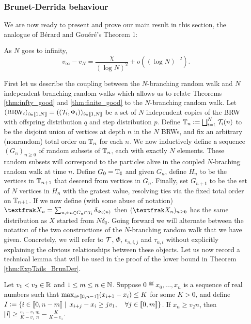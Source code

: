 \subsubsection{Brunet-Derrida behaviour}\label{sec:ExpTails_BrunDer}

We are now ready to present and prove our main result in this section, the analogue of Bérard and Gouéré's Theorem 1:
\begin{theorem}\label{thm:ExpTails_BrunDer}
As $N$ goes to infinity, 
\begin{equation*}
v_\infty - v_N = \frac{\chi}{(\log N)^2} + o((\log N)^{-2}). 
\end{equation*}
\end{theorem}

First let us describe the coupling between the $N$-branching random walk and $N$ independent branching random walks which allows us to relate Theorems \ref{thm:infty_good} and \ref{thm:finite_good} to the $N$-branching random walk. Let $(\text{BRW}_i)_{i \in \bbracket{1,N}} = ((\cal{T}_i, \Phi_i))_{i \in \bbracket{1,N}}$ be a set of $N$ independent copies of the BRW with offspring distribution $q$ and step distribution $p$. Define $\bb{T}_n \defeq \bigsqcup_{i=1}^N \cal{T}_i(n)$ to be the disjoint union of vertices at depth $n$ in the $N$ BRWs, and fix an arbitrary (nonrandom) total order on $\bb{T}_n$ for each $n$. We now inductively define a sequence $(G_n)_{n \geq 0}$ of random subsets of $\bb{T}_n$, each with exactly $N$ elements. These random subsets will correspond to the particles alive in the coupled $N$-braching random walk at time $n$. Define $G_0 = \bb{T}_0$ and given $G_n$, define $H_n$ to be the vertices in $\bb{T}_{n+1}$ that descend from vertices in $G_n$. Finally, set $G_{n+1}$ to be the set of $N$ vertices in $H_n$ with the gratest value, resolving ties via the fixed total order on $\bb{T}_{n+1}$. If we now define (with some abuse of notation) $\frak{X}_n = \sum_{u,i : u \in G_n \cap \cal{T}_i} \delta_{\Phi_i(u)}$ then $(\frak{X}_n)_{n \geq 0}$ has the same distribution as $X$ started from $N \delta_0$. Going forward we will alternate between the notation of the two constructions of the $N$-branching random walk that we have given. Concretely, we will refer to $\cal{T}$, $\Phi$, $\epsilon_{n,i,j}$ and $\tau_{n,i}$ without explicitly explaining the obvious relationships between these objects. Let us now record a technical lemma that will be used in the proof of the lower bound in Theorem \ref{thm:ExpTails_BrunDer}. 

\begin{lemma}\label{lem:ExpTailsGoodSequencesTechnical}
Let $v_1 < v_2 \in \R$ and $1 \leq m \leq n \in \N$. Suppose $0 \eqdef x_0, ..., x_n$ is a sequence of real numbers such that $\max_{i \in \bbracket{0, n - 1}} (x_{i+1} - x_i) \leq K$ for some $K > 0$, and define $I \defeq \{ i \in \bbracket{0, n - m} \mid\, x_{i + j} - x_i \geq j v_1,\quad \forall j\in\bbracket{0,m}\}$. If $x_n \geq v_2 n$, then $|I| \geq \frac{v_2 - v_1}{K - v_1}\frac{m}{n} - \frac{K}{K - v_1}$. 
\end{lemma}

